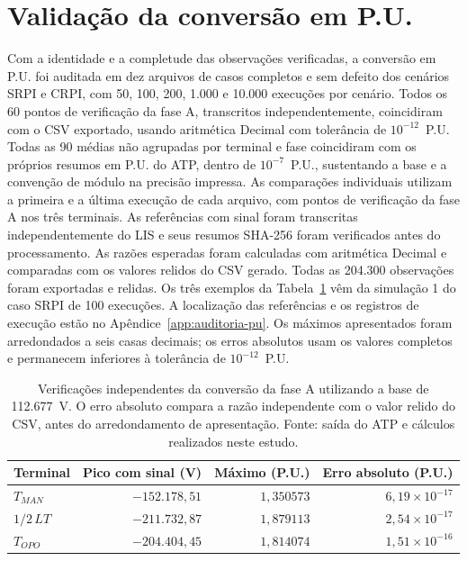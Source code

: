 \documentclass[
	12pt,				%
	openright,			%
	oneside,			%
	a4paper,			%
	chapter=TITLE,		%
	section=TITLE,		%
	subsection=TITLE,	%
	subsubsection=TITLE,%
	english,			%
	brazilian			%
	]{abntex2}
\theoremstyle{definition}
\begin{document}
\section{Validação da conversão em P.U.}

Com a identidade e a completude das observações verificadas, a conversão
em P.U. foi auditada em dez arquivos de casos completos e sem defeito dos
cenários SRPI e CRPI, com 50, 100, 200,
1.000 e 10.000 execuções por cenário. Todos os 60 pontos de
verificação da fase A, transcritos independentemente, coincidiram com o CSV
exportado, usando aritmética Decimal com tolerância de $10^{-12}$~P.U. Todas
as 90 médias não agrupadas por terminal e fase coincidiram com os próprios
resumos em P.U. do ATP, dentro de $10^{-7}$~P.U., sustentando a base e a
convenção de módulo na precisão impressa. As comparações individuais utilizam
a primeira e a última execução de cada arquivo, com pontos de verificação da
fase A nos três terminais. As referências com sinal foram transcritas
independentemente do LIS e seus resumos SHA-256 foram verificados antes do
processamento. As razões esperadas foram calculadas com aritmética Decimal e
comparadas com os valores relidos do CSV gerado. Todas as 204.300 observações
foram exportadas e relidas. Os três exemplos da Tabela~\ref{tab:pu-validation}
vêm da simulação 1 do caso SRPI de 100 execuções. A localização das
referências e os registros de execução estão no
Apêndice~\ref{app:auditoria-pu}. Os máximos apresentados foram arredondados
a seis casas decimais; os erros absolutos usam os valores completos e
permanecem inferiores à tolerância de $10^{-12}$~P.U.

\begin{table}[htbp]
\centering
\caption{Verificações independentes da conversão da fase A utilizando a base
de 112.677~V. O erro absoluto compara a razão independente com o valor
relido do CSV, antes do arredondamento de apresentação.
Fonte: saída do ATP e cálculos realizados neste estudo.}
\label{tab:pu-validation}
\small
\begin{tabular}{lrrr}
\hline
Terminal & Pico com sinal (V) & Máximo (P.U.) & Erro absoluto (P.U.) \\
\hline
$T_{MAN}$ & $-152.178{,}51$ & $1{,}350573$ & $6{,}19\times10^{-17}$ \\
$1/2\,LT$ & $-211.732{,}87$ & $1{,}879113$ & $2{,}54\times10^{-17}$ \\
$T_{OPO}$ & $-204.404{,}45$ & $1{,}814074$ & $1{,}51\times10^{-16}$ \\
\hline
\end{tabular}
\end{table}
\end{document}

